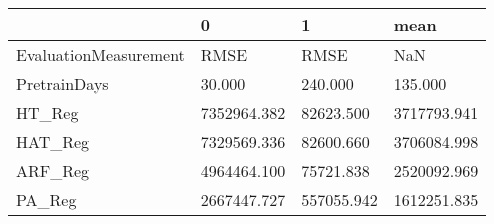\begin{tabular}{llll}
\toprule
{} &            0 &           1 &         mean \\
\midrule
EvaluationMeasurement &         RMSE &        RMSE &          NaN \\
PretrainDays          &       30.000 &     240.000 &      135.000 \\
HT\_Reg                &  7352964.382 &   82623.500 &  3717793.941 \\
HAT\_Reg               &  7329569.336 &   82600.660 &  3706084.998 \\
ARF\_Reg               &  4964464.100 &   75721.838 &  2520092.969 \\
PA\_Reg                &  2667447.727 &  557055.942 &  1612251.835 \\
\bottomrule
\end{tabular}
